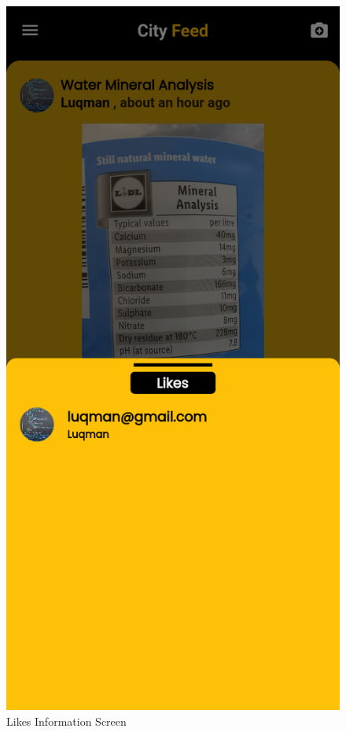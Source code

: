 \begin{figure}[H]
    \centering
    \includegraphics[scale=0.12]{App Screenshots/LikesInfo.png}
    \caption{Likes Information Screen}
    \label{fig:Likes Information Screen}
\end{figure}

